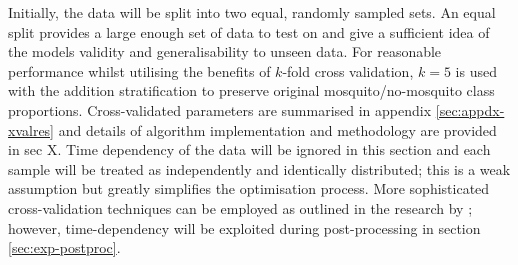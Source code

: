         Initially, the data will be split into two equal, randomly sampled sets. An equal split provides a large enough set of data to test on and give a sufficient idea of the models validity and generalisability to unseen data. For reasonable performance whilst utilising the benefits of $k$-fold cross validation, $k=5$ is used with the addition stratification to preserve original mosquito/no-mosquito class proportions. Cross-validated parameters are summarised in appendix \ref{sec:appdx-xvalres} and details of algorithm implementation and methodology are provided in sec X. Time dependency of the data will be ignored in this section and each sample will be treated as independently and identically distributed; this is a weak assumption but greatly simplifies the optimisation process. More sophisticated cross-validation techniques can be employed as outlined in the research by \textcite{Yang2001}; however, time-dependency will be exploited during post-processing in section \ref{sec:exp-postproc}.

        
        
    
        
     
         
  
    
        
